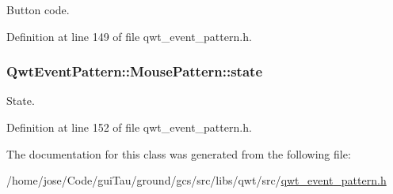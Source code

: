 Button code. 



Definition at line 149 of file qwt\-\_\-event\-\_\-pattern.\-h.

\hypertarget{class_qwt_event_pattern_1_1_mouse_pattern_a2fa8afdd823b259234dba054d9394727}{
\subsubsection[{state}]{ Qwt\-Event\-Pattern\-::\-Mouse\-Pattern\-::state}}\label{class_qwt_event_pattern_1_1_mouse_pattern_a2fa8afdd823b259234dba054d9394727}


State. 



Definition at line 152 of file qwt\-\_\-event\-\_\-pattern.\-h.



The documentation for this class was generated from the following file\-:\begin{DoxyCompactItemize}
\item 
/home/jose/\-Code/gui\-Tau/ground/gcs/src/libs/qwt/src/\hyperlink{qwt__event__pattern_8h}{qwt\-\_\-event\-\_\-pattern.\-h}\end{DoxyCompactItemize}
